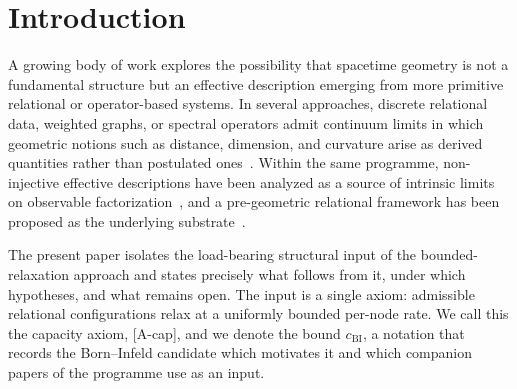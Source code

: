 \documentclass[epj]{svjour}
\begin{document}
  \maketitle

  \section{Introduction}
    \label{sec:introduction}

    A growing body of work explores the possibility that spacetime geometry is not a fundamental
    structure but an effective description emerging from more primitive relational or operator-based
    systems.
    In several approaches, discrete relational data, weighted graphs, or spectral operators admit
    continuum limits in which geometric notions such as distance, dimension, and curvature arise as
    derived quantities rather than postulated ones~\cite{Beau2026a}.
    Within the same programme, non-injective effective descriptions have been analyzed as a source of
    intrinsic limits on observable factorization~\cite{Beau2026b}, and a pre-geometric relational
    framework has been proposed as the underlying substrate~\cite{Beau2026whitepaper}.

    The present paper isolates the load-bearing structural input of the bounded-relaxation approach
    and states precisely what follows from it, under which hypotheses, and what remains open.
    The input is a single axiom: admissible relational configurations relax at a uniformly bounded
    per-node rate.
    We call this the capacity axiom, [A-cap], and we denote the bound $c_{\mathrm{BI}}$, a notation
    that records the Born--Infeld candidate which motivates it and which companion papers of the
    programme use as an input.
\end{document}
